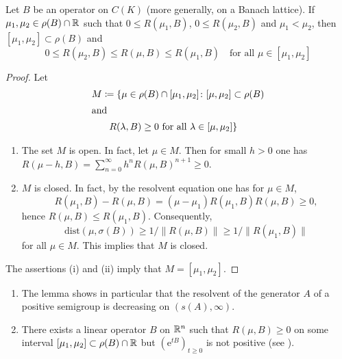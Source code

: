 %
\begin{lemma}\label{lem:b2-1.9}
Let $B$ be an operator on $C(K)$ (more generally, on a Banach lattice).
If $\mu_{1}, \mu_{2} \in \rho(B) \cap \mathbb{R}$ such that $0 \leq R(\mu_{1},B)$, $0 \leq R(\mu_{2},B)$ and $\mu_{1} < \mu_{2}$, then $[\mu_{1},\mu_{2}] \subset \rho(B)$ and
\[
    0 \leq R(\mu_{2},B) \leq R(\mu,B) \leq R(\mu_{1},B) \quad \text{for all } \mu \in [\mu_{1},\mu_{2}]
\]
\end{lemma}
\begin{proof}
Let 
\begin{align*}
M \coloneqq \{\mu \in \rho(B) & \cap [\mu_{1},\mu_{2}] \colon [\mu,\mu_{2}] \subset \rho(B) \\
\intertext{and}
R(\lambda,B) \geq 0 &\text{ for all } \lambda \in [\mu,\mu_{2}]\}
\end{align*}
\begin{enumerate}[\upshape (i), wide, labelindent=.5em]
	\item
	The set $M$ is open.
	In fact, let $\mu \in M$.
	Then for small $h > 0$ one has \\
	$R(\mu-h,B) = \sum_{n=0}^{\infty} h^{n}R(\mu,B)^{n+1} \geq 0$.
    \item 
 	$M$ is closed.
	In fact, by the resolvent equation one has for $\mu \in M$,  
\[
	R(\mu_{1},B) - R(\mu,B) = (\mu - \mu_{1})R(\mu_{1},B)R(\mu,B) \geq 0 ,
\]
%
hence $R(\mu,B) \leq R(\mu_{1},B)$.
	Consequently, 
\[
	\text{dist}(\mu,\sigma(B)) \geq 1/\|R(\mu,B)\| \geq 1/\|R(\mu_{1},B)\|
\]
%
for all $\mu \in M$.
This implies that $M$ is closed.
\end{enumerate}
The assertions (i) and (ii) imply that $M = [\mu_{1},\mu_{2}]$.
\end{proof}
\begin{remark*}\label{rem:b2-1.9-kgk1}
\begin{enumerate}[\upshape (i), wide, labelindent=.5em]  

\item \label{rem:b2-1.9-1}
The lemma shows in particular that the resolvent of the generator $A$ of a positive semigroup is decreasing on $(s(A),\infty)$.

\item \label{rem:b2-1.9-2}
There exists a linear operator $B$ on $\mathbb{R}^{n}$ such that $R(\mu,B) \geq 0$ on some interval $[\mu_{1},\mu_{2}] \subset \rho(B) \cap \mathbb{R}$ but $(\mathrm{e}^{tB})_{t \geq 0}$ is not positive (see \citet{greinervoigtwolff:1981}
).
\end{enumerate}
\end{remark*}

